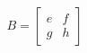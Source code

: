 \documentclass[preview]{standalone}
\begin{document}
\begin{align*}
B = \begin{bmatrix} e & f \\ g & h \end{bmatrix}
\end{align*}
\end{document}
